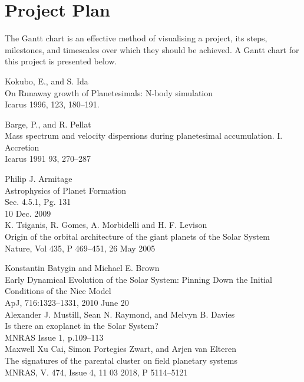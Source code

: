 \documentclass[a4paper,10pt]{article}
\begin{document}
\section{Project Plan}

The Gantt chart is an effective method of visualising a project, its steps, milestones, and timescales over which they should be achieved. A Gantt chart for this project is presented below.

\begin{thebibliography}{9}

Kokubo, E., and S. Ida\\
On Runaway growth of Planetesimals: N-body simulation\\ 
Icarus 1996, 123, 180--191.

Barge, P., and R. Pellat\\ 
Mass spectrum and velocity dispersions during planetesimal accumulation. I. Accretion\\
Icarus 1991 93, 270--287

Philip J. Armitage\\
Astrophysics of Planet Formation\\
Sec. 4.5.1, Pg. 131\\
10 Dec. 2009\\

K. Tsiganis, R. Gomes, A. Morbidelli and H. F. Levison\\
Origin of the orbital architecture of the giant planets of the Solar System\\ 
Nature, Vol 435, P 469--451, 26 May 2005

Konstantin Batygin and Michael E. Brown\\
Early Dynamical Evolution of the Solar System: Pinning Down the Initial Conditions of the Nice Model\\
 ApJ, 716:1323--1331, 2010 June 20\\

Alexander J. Mustill, Sean N. Raymond, and Melvyn B. Davies\\
Is there an exoplanet in the Solar System?\\
MNRAS Issue 1, p.109--113\\

Maxwell Xu Cai, Simon Portegies Zwart, and Arjen van Elteren\\ 
The signatures of the parental cluster on field planetary systems\\
MNRAS, V. 474, Issue 4, 11 03 2018, P 5114--5121\\


\end{thebibliography}
\end{document}
